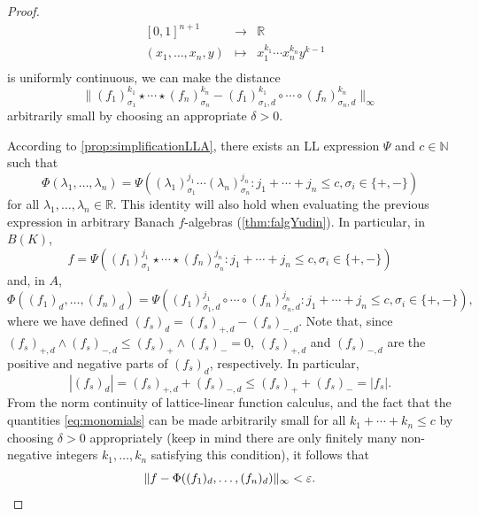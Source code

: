 \documentclass{memo-l}
\theoremstyle{definition}
\theoremstyle{remark}
\numberwithin{section}{chapter}
\numberwithin{equation}{chapter}
\newcommand\N{\ensuremath{\mathbb{N}}}
\newcommand\R{\ensuremath{\mathbb{R}}}
\newcommand{\falg}{$f\!$-algebra}
\begin{document}
\begin{proof}
\[\begin{array}{cccc}
    & [0,1]^{n+1} & \longrightarrow & \R \\
            & (x_1,\ldots ,x_n,y) & \longmapsto & x_1^{k_1}\cdots
            x_n^{k_n}y^{k-1} \\
    \end{array}
    \]
    is uniformly continuous, we can make the distance
    \begin{equation}\label{eq:monomials}
    \|(f  _1)_{\sigma _1}^{k_1}\star \cdots \star (f
        _n)_{\sigma _n}^{k_n}-(f  _1)_{\sigma _1,d}^{k_1}\circ \cdots \circ (f
        _n)_{\sigma _n,d}^{k_n}\|_\infty
    \end{equation}
    arbitrarily small by choosing an appropriate $\delta >0$.

    According to
    \cref{prop:simplificationLLA}, there exists an LL
    expression $\Psi $ and $c \in \N$ such that
    \[
    \Phi (\lambda _1,\ldots ,\lambda _n)=\Psi ((\lambda  _1)_{\sigma
    _1}^{j_1}\cdots (\lambda  _n)_{\sigma _n}^{j_n}:j_1+ \cdots +j_n\le c, \sigma_i \in \{+,-\})
    \]
    for all $\lambda _1,\ldots ,\lambda _n \in \R$.
    This identity will also hold when evaluating the previous
    expression in arbitrary Banach \falg s (\cref{thm:falgYudin}).
    In particular, in $B(K)$,
    \[
    f=\Psi ((f  _1)_{\sigma
    _1}^{j_1}\star\cdots \star(f  _n)_{\sigma _n}^{j_n}:j_1+ \cdots +j_n\le c,
    \sigma_i \in \{+,-\})
    \]
    and, in $A$,
    \[
    \Phi ((f_1)_d,\ldots ,(f_n)_d)=\Psi ((f  _1)_{\sigma
    _1,d}^{j_1}\circ\cdots \circ(f _n)_{\sigma _n,d}^{j_n}:j_1+ \cdots
    +j_n\le c, \sigma_i \in \{+,-\}),
    \]
    where we have defined $(f_s)_d=(f_s)_{+,d}-(f_s)_{-,d}$. Note that, since
    $(f_s)_{+,d}\wedge (f_s)_{-,d}\le (f_s)_+\wedge (f_s)_{-}=0$,
    $(f_s)_{+,d}$ and $(f_s)_{-,d}$ are the positive and negative
    parts of $(f_s)_d$, respectively. In particular,
    \[
        |(f_s)_d|=(f_s)_{+,d}+(f_s)_{-,d}\le (f_s)_++(f_s)_-=|f_s|.
    \]
    From the norm continuity of lattice-linear function calculus, and the fact
    that the quantities \eqref{eq:monomials} can be made arbitrarily
    small for all $k_1+ \cdots +k_n\le c$ by choosing $\delta >0$
    appropriately (keep in mind there are only finitely many
    non-negative integers
    $k_1,\ldots ,k_n$ satisfying this condition), it follows that
    \begin{equation*}
    \|f-\Phi ((f_1)_d,\ldots ,(f_n)_d)\|_\infty <\varepsilon.\qedhere
    \end{equation*}
\end{proof}
\end{document}
